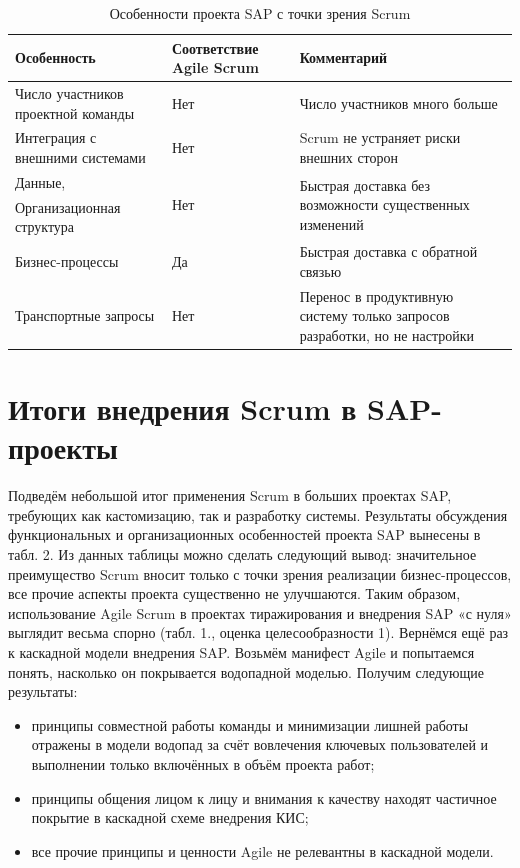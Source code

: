 \documentclass[12pt]{article}
\begin{document}
\begin{table}[h!]\begin{center}
  \caption{Особенности проекта SAP с точки зрения Scrum}\label{tab:SapScrumSpecifications}
  \begin{tabular}{|p{4cm}|p{2.5cm}|p{5cm}|}
    \hline
    Особенность & Соответствие Agile Scrum & Комментарий \\ \hline
    Число участников проектной команды & Нет & Число участников много больше \\ \hline
    Интеграция с внешними системами & Нет & Scrum не устраняет риски внешних сторон \\ \hline
    Данные,  & \multirow{2}{*}{Нет}& \multirow{2}{5cm}{Быстрая доставка без возможности существенных изменений}   \\
    Организационная структура &                             &                                         \\ \hline
    Бизнес-процессы  & Да & Быстрая доставка с обратной связью \\ \hline
    Транспортные запросы & Нет & Перенос в продуктивную систему только запросов разработки, но не настройки \\ \hline
  \end{tabular}
\end{center}\end{table}

\section{Итоги внедрения Scrum в SAP-проекты}
Подведём небольшой итог применения Scrum в больших проектах SAP,
требующих как кастомизацию, так и разработку системы. Результаты обсуждения
функциональных и организационных особенностей проекта SAP вынесены в табл. 2.
Из данных таблицы можно сделать следующий вывод: значительное преимущество
Scrum вносит только с точки зрения реализации бизнес-процессов, все прочие
аспекты проекта существенно не улучшаются. Таким образом, использование Agile
Scrum в проектах тиражирования и внедрения SAP «с нуля» выглядит весьма спорно
(табл. 1., оценка целесообразности 1).
Вернёмся ещё раз к каскадной модели внедрения SAP. Возьмём манифест Agile
\cite{ScrumSap} и попытаемся понять, насколько он покрывается водопадной моделью. Получим
следующие результаты:

\begin{itemize}
  \item принципы совместной работы команды и минимизации лишней работы
отражены в модели водопад за счёт вовлечения ключевых пользователей и
выполнении только включённых в объём проекта работ;
  \item принципы общения лицом к лицу и внимания к качеству находят частичное
покрытие в каскадной схеме внедрения КИС;
  \item все прочие принципы и ценности Agile не релевантны в каскадной модели.
\end{itemize}
\end{document}
